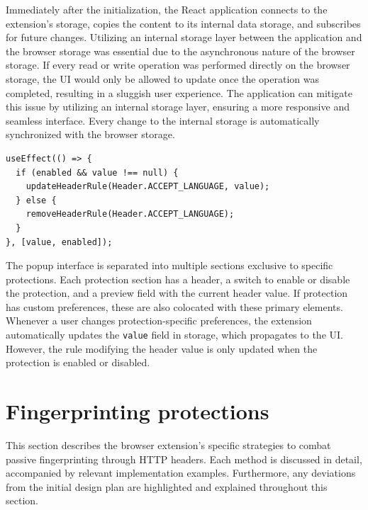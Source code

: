Immediately after the initialization, the React application connects to the extension's storage, copies the content to its internal data storage, and subscribes for future changes. Utilizing an internal storage layer between the application and the browser storage was essential due to the asynchronous nature of the browser storage. If every read or write operation was performed directly on the browser storage, the UI would only be allowed to update once the operation was completed, resulting in a sluggish user experience. The application can mitigate this issue by utilizing an internal storage layer, ensuring a more responsive and seamless interface. Every change to the internal storage is automatically synchronized with the browser storage.

\bigbreak

\begin{lstlisting}[caption={A part of the code that updates the HTTP header-modifying rule when a protection is enabled or disabled.}]
useEffect(() => {
  if (enabled && value !== null) {
    updateHeaderRule(Header.ACCEPT_LANGUAGE, value);
  } else {
    removeHeaderRule(Header.ACCEPT_LANGUAGE);
  }
}, [value, enabled]);
\end{lstlisting}

\medbreak

The popup interface is separated into multiple sections exclusive to specific protections. Each protection section has a header, a switch to enable or disable the protection, and a preview field with the current header value. If protection has custom preferences, these are also colocated with these primary elements. Whenever a user changes protection-specific preferences, the extension automatically updates the \texttt{value} field in storage, which propagates to the UI. However, the rule modifying the header value is only updated when the protection is enabled or disabled.

\section{Fingerprinting protections}

This section describes the browser extension's specific strategies to combat passive fingerprinting through HTTP headers. Each method is discussed in detail, accompanied by relevant implementation examples. Furthermore, any deviations from the initial design plan are highlighted and explained throughout this section.

\bigbreak

